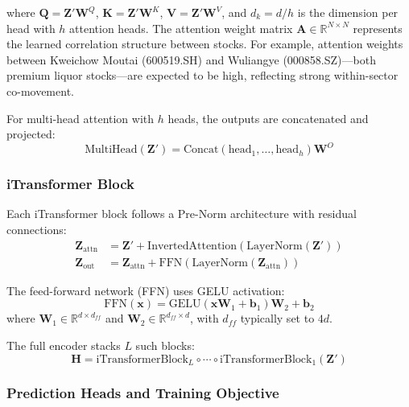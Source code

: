 \documentclass[12pt, a4paper]{article}
\begin{document}
where $\mathbf{Q} = \mathbf{Z}' \mathbf{W}^Q$, $\mathbf{K} = \mathbf{Z}' \mathbf{W}^K$, $\mathbf{V} = \mathbf{Z}' \mathbf{W}^V$, and $d_k = d / h$ is the dimension per head with $h$ attention heads. The attention weight matrix $\mathbf{A} \in \mathbb{R}^{N \times N}$ represents the learned correlation structure between stocks. For example, attention weights between Kweichow Moutai (600519.SH) and Wuliangye (000858.SZ)---both premium liquor stocks---are expected to be high, reflecting strong within-sector co-movement.

For multi-head attention with $h$ heads, the outputs are concatenated and projected:
\begin{equation}
\text{MultiHead}(\mathbf{Z}') = \text{Concat}(\text{head}_1, \ldots, \text{head}_h) \mathbf{W}^O
\end{equation}

\subsubsection{iTransformer Block}

Each iTransformer block follows a Pre-Norm architecture with residual connections:
\begin{align}
\mathbf{Z}_{\text{attn}} &= \mathbf{Z}' + \text{InvertedAttention}(\text{LayerNorm}(\mathbf{Z}')) \\
\mathbf{Z}_{\text{out}} &= \mathbf{Z}_{\text{attn}} + \text{FFN}(\text{LayerNorm}(\mathbf{Z}_{\text{attn}}))
\end{align}

The feed-forward network (FFN) uses GELU activation:
\begin{equation}
\text{FFN}(\mathbf{x}) = \text{GELU}(\mathbf{x} \mathbf{W}_1 + \mathbf{b}_1) \mathbf{W}_2 + \mathbf{b}_2
\end{equation}
where $\mathbf{W}_1 \in \mathbb{R}^{d \times d_{ff}}$ and $\mathbf{W}_2 \in \mathbb{R}^{d_{ff} \times d}$, with $d_{ff}$ typically set to $4d$.

The full encoder stacks $L$ such blocks:
\begin{equation}
\mathbf{H} = \text{iTransformerBlock}_L \circ \cdots \circ \text{iTransformerBlock}_1 (\mathbf{Z}')
\end{equation}

\subsubsection{Prediction Heads and Training Objective}
\end{document}
